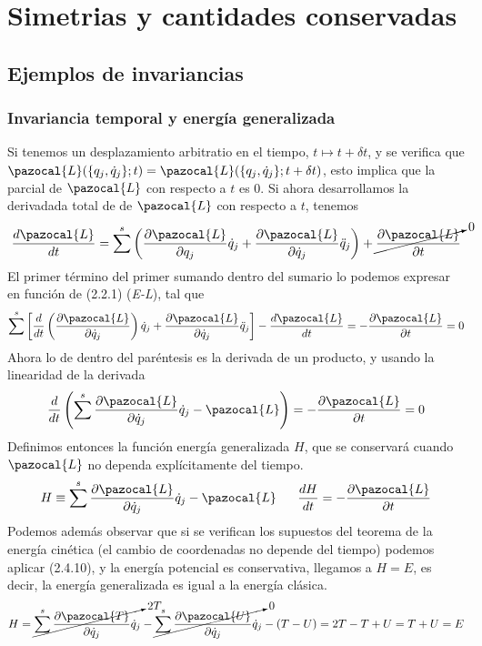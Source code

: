 \chapter{Simetrias y cantidades conservadas}

\section{Ejemplos de invariancias} 
\subsection{Invariancia temporal y energía generalizada}
Si tenemos un desplazamiento arbitratio en el tiempo, $t\mapsto t + \delta t$, y se verifica que $\pazocal{L}(\{q_j,\dot{q}_j\};t)=\pazocal{L}(\{q_j,\dot{q}_j\};t+\delta t)$, esto implica que la parcial de $\pazocal{L}$ con respecto a $t$ es 0. Si ahora desarrollamos la derivadada total de de $\pazocal{L}$ con respecto a $t$, tenemos
\vspace{-13pt}
\[\frac{d \pazocal{L}}{dt}=\sum^s\left(\frac{\partial \pazocal{L}}{\partial q_j}\dot{q}_j+\frac{\partial \pazocal{L}}{\partial \dot{q}_j}\ddot{q}_j\right)+\cancelto{0}{\frac{\partial \pazocal{L}}{\partial t}}\]
El primer término del primer sumando dentro del sumario lo podemos expresar en función de (2.2.1)  (\textit{E-L}), tal que
\[\sum^s\left[\frac{d}{dt}\left(\frac{\partial \pazocal{L}}{\partial \dot{q}_j}\right)\dot{q}_j+\frac{\partial \pazocal{L}}{\partial \dot{q}_j}\ddot{q}_j\right]-\frac{d \pazocal{L}}{dt} = -\frac{\partial \pazocal{L}}{\partial t} =0\]
Ahora lo de dentro del paréntesis es la derivada de un producto, y usando la linearidad de la derivada
\begin{equation} \label{3.1.1}
    \frac{d}{dt}\left(\sum^s \frac{\partial \pazocal{L}}{\partial \dot{q}_j}\dot{q}_j-\pazocal{L}\right) = -\frac{\partial \pazocal{L}}{\partial t} =0
\end{equation} 
Definimos entonces la función energía generalizada $H$, que se conservará cuando $\pazocal{L}$ no dependa explícitamente del tiempo.
\begin{equation} \label{3.1.2}
    H \equiv \sum^s \frac{\partial \pazocal{L}}{\partial \dot{q}_j}\dot{q}_j-\pazocal{L} \ \ \ \ \ \frac{d H}{dt}=-\frac{\partial \pazocal{L}}{\partial t}
\end{equation}  
Podemos además observar que si se verifican los supuestos del teorema de la energía cinética (el cambio de coordenadas no depende del tiempo) podemos aplicar (2.4.10), y la energía potencial es conservativa, llegamos a $H=E$, es decir, la energía generalizada es igual a la energía clásica.
\vspace{-10pt}
\begin{equation} \label{3.1.3}
    H = \cancelto{2T}{\sum^s\frac{\partial \pazocal{T}}{\partial \dot{q}_j}\dot{q}_j}-\cancelto{0}{\sum^s\frac{\partial \pazocal{U}}{\partial \dot{q}_j}\dot{q}_j}-(T-U)= 2T -T + U = T+U =E 
\end{equation} 

